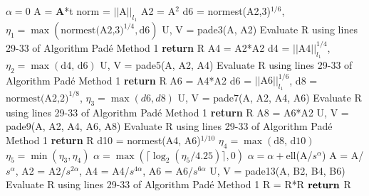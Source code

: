\begin{algorithm}
	\caption{Pad\'e Method 2} 
	\begin{algorithmic}[1]
		\State $\alpha = 0$ 
		\State A = $\boldsymbol{A}$*t 
		\State norm = $||\text{A}||_{l_{1}}$ 
		\State A2 = A$^{2}$ 
		\State d6 = normest(A2,3)$^{1/6}$,  $\eta_{1} = \max(\text{normest(A2,3)}^{1/4}, \text{d6})$
         
            \State U, V = pade3(A, A2)
            \State Evaluate R using lines 29-33 of Algorithm Pad\'e Method 1
            \State \textbf{return} R
        \EndIf
        \State A4 = A2*A2
        \State d4 = $||\text{A4}||_{l_{1}}^{1/4}$, $\eta_{2} = \max(\text{d4, d6})$
         
            \State U, V = pade5(A, A2, A4)
            \State Evaluate R using lines 29-33 of Algorithm Pad\'e Method 1
            \State \textbf{return} R
        \EndIf
        \State A6 = A4*A2
        \State d6 = $||\text{A6}||_{l_{1}}^{1/6}$, d8 = $\text{normest(A2,2)}^{1/8}$, $\eta_{3} = \max(d6,d8)$
         
            \State U, V = pade7(A, A2, A4, A6)
            \State Evaluate R using lines 29-33 of Algorithm Pad\'e Method 1
            \State \textbf{return} R
        \EndIf 
         
            \State A8 = A6*A2
            \State U, V = pade9(A, A2, A4, A6, A8)
            \State Evaluate R using lines 29-33 of Algorithm Pad\'e Method 1
            \State \textbf{return} R
        \EndIf 
        \State d10 = normest(A4, A6)$^{1/10}$
        \State $\eta_{4} = \max(\text{d8, d10})$
        \State $\eta_{5} = \min(\eta_{3}, \eta_{4})$
        \State $\alpha = \max(\lceil \log_{2}(\eta_{5}/4.25)\rceil, 0)$
        \State $\alpha = \alpha + $ell(A/$s^{\alpha}$) 
        \State A = A/$s^{\alpha}$, A2 = A2/$s^{2\alpha}$, A4 = A4/$s^{4\alpha}$, A6 = A6/$s^{6\alpha}$
        \State U, V = pade13(A, B2, B4, B6) 
        \State Evaluate R using lines 29-33 of Algorithm Pad\'e Method 1
         
            \State R = R*R
        \EndFor
        \State ${\text{\textbf{return}}}$ R
		\EndProcedure
	\end{algorithmic} 
	\label{alg:method2}
\end{algorithm}



